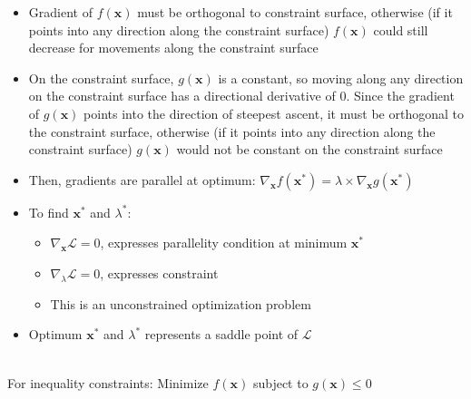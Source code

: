 \begin{itemize}
    \item Gradient of $f(\boldsymbol{x})$ must be orthogonal to constraint surface, otherwise (if it points into any direction along the constraint surface) $f(\boldsymbol{x})$ could still decrease for movements along the constraint surface
    \item On the constraint surface, $g(\boldsymbol{x})$ is a constant, so moving along any direction on the constraint surface has a directional derivative of 0. Since the gradient of $g(\boldsymbol{x})$ points into the direction of steepest ascent, it must be orthogonal to the constraint surface, otherwise (if it points into any direction along the constraint surface) $g(\boldsymbol{x})$ would not be constant on the constraint surface
    \item Then, gradients are parallel at optimum: $\nabla_{\boldsymbol{x}} f(\boldsymbol{x^*}) = \lambda \times \nabla_{\boldsymbol{x}} g(\boldsymbol{x^*})$
    \item To find $\boldsymbol{x^*}$ and $\lambda^*$: 
    \begin{itemize}
        \item $\nabla_{\boldsymbol{x}} \mathcal{L} = 0$, expresses parallelity condition at minimum $\boldsymbol{x^*}$
        \item $\nabla_{\lambda} \mathcal{L} = 0$, expresses constraint
        \item This is an unconstrained optimization problem
    \end{itemize}
    \item Optimum $\boldsymbol{x^*}$ and $\lambda^*$ represents a saddle point of $\mathcal{L}$
\end{itemize}\\
For inequality constraints: Minimize $f(\boldsymbol{x})$ subject to $g(\boldsymbol{x}) \leq 0$ 

